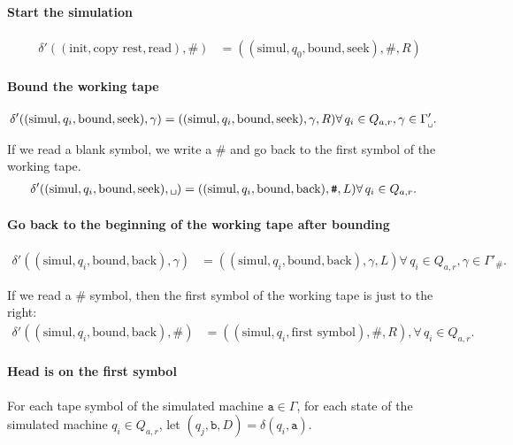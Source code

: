 \documentclass{article}
\newcommand{\0}{\texttt{\textvisiblespace}}
\newcommand{\°}{\obullet{\0}}
\newcommand{\s}{\texttt{a}}
\newcommand{\w}{\texttt{b}}
\newcommand{\e}{\texttt{\#}}
\newcommand{\gpwb}{\Gamma'_{\0{}}}
\newcommand{\gpwe}{\Gamma'_{\e{}}}
\newcommand{\qwar}{Q_{a,r}}
\begin{document}
\paragraph{Start the simulation}
\begin{align}
  \delta'((\text{init},\text{copy rest},\text{read}), \e)
  &= ((\text{simul},q_0, \text{bound}, \text{seek}), \e, R)
\end{align}

\paragraph{Bound the working tape}
\begin{align}
  \delta'((\text{simul}, q_i, \text{bound}, \text{seek}),\gamma)
  &=((\text{simul},
  q_i, \text{bound}, \text{seek}),\gamma,R)
  \forall\,
  q_i \in \qwar,
  \gamma \in \gpwb.
\end{align}

If we read a blank symbol, we write a $\e$ and go back to the first symbol
of the working tape.
\begin{align}
  \delta'((\text{simul}, q_i, \text{bound}, \text{seek}),\0{})
  &=((\text{simul},
  q_i, \text{bound}, \text{back}),\e,L)
  \forall\,
  q_i \in \qwar.
\end{align}

\paragraph{Go back to the beginning of the working tape after bounding}
\begin{align}
  \delta'((\text{simul}, q_i, \text{bound}, \text{back}),\gamma)
  &=((\text{simul},
  q_i, \text{bound}, \text{back}),\gamma,L)
  \forall\,
  q_i \in \qwar,
  \gamma \in \gpwe.
\end{align}

If we read a $\e$ symbol, then the first symbol of the working tape is just to
the right:
\begin{align}
  \delta'((\text{simul}, q_i, \text{bound}, \text{back}),\e{})
  &=((\text{simul},
  q_i, \text{first symbol}),\e,R),
  \forall\,
  q_i \in \qwar.
\end{align}

\paragraph{Head is on the first symbol}
For each tape symbol of the simulated machine $\s \in \Gamma$,
for each state of the simulated machine $q_i \in \qwar$,
let $(q_j, \w, D)=\delta(q_i,\s)$.
\end{document}
